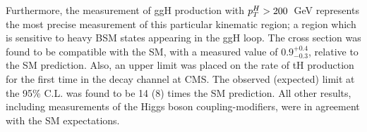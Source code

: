 Furthermore, the measurement of ggH production with $p_T^H>200$~GeV represents the most precise measurement of this particular kinematic region; a region which is sensitive to heavy BSM states appearing in the ggH loop. The cross section was found to be compatible with the SM, with a measured value of $0.9^{+0.4}_{-0.3}$, relative to the SM prediction. Also, an upper limit was placed on the rate of tH production for the first time in the \Hgg decay channel at CMS. The observed (expected) limit at the 95\% C.L. was found to be 14 (8) times the SM prediction. All other results, including measurements of the Higgs boson coupling-modifiers, were in agreement with the SM expectations.